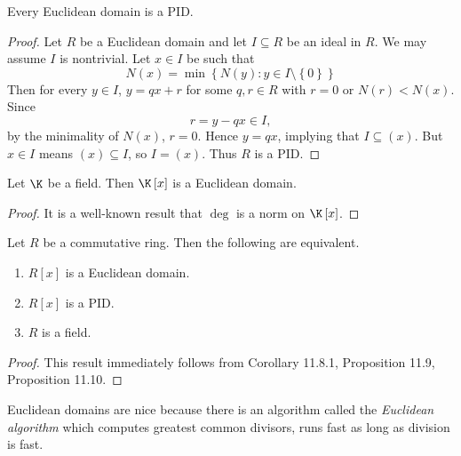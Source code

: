 \documentclass[pmath347]{subfiles}
\begin{document}
    \begin{prop}{}
        Every Euclidean domain is a PID.
    \end{prop}

    \begin{proof}
        Let $R$ be a Euclidean domain and let $I\subseteq R$ be an ideal in $R$. We may assume $I$ is nontrivial. Let $x\in I$ be such that
        \begin{equation*}
            N\left( x \right)  = \min\left\lbrace N\left( y \right) :y\in I\setminus \left\lbrace 0 \right\rbrace \right\rbrace 
        \end{equation*}
        Then for every $y\in I$, $y=qx+r$ for some $q,r\in R$ with $r=0$ or $N\left( r \right) < N\left( x \right)$. Since
        \begin{equation*}
            r = y-qx\in I,
        \end{equation*}
        by the minimality of $N\left( x \right)$, $r=0$. Hence $y=qx$, implying that $I\subseteq \left( x \right)$. But $x\in I$ means $\left( x \right) \subseteq I$, so $I=\left( x \right)$. Thus $R$ is a PID.
    \end{proof}

    \begin{prop}{}
        Let $\K$ be a field. Then $\K\left[ x \right]$ is a Euclidean domain.
    \end{prop}

    \begin{proof}
        It is a well-known result that $\deg$ is a norm on $\K\left[ x \right]$.
    \end{proof}

    \begin{cor}{}
        Let $R$ be a commutative ring. Then the following are equivalent.
        \begin{enumerate}
            \item $R\left[ x \right]$ is a Euclidean domain.
            \item $R\left[ x \right]$ is a PID.
            \item $R$ is a field.
        \end{enumerate}
    \end{cor}	

    \begin{proof}
        This result immediately follows from Corollary 11.8.1, Proposition 11.9, Proposition 11.10.
    \end{proof}

    \np Euclidean domains are nice because there is an algorithm called the \textit{Euclidean algorithm} which computes greatest common divisors, runs fast as long as division is fast.
\end{document}

